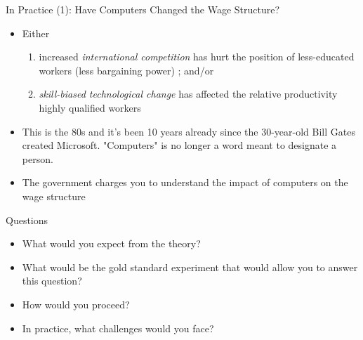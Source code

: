 \documentclass[notes,10pt, aspectratio=169]{beamer}
\begin{document}
\begin{frame}{In Practice (1): Have Computers Changed the Wage Structure?}
\begin{itemize}
    \item Either
    \begin{enumerate}
        \item increased \textit{international competition} has hurt the position of less-educated workers (less bargaining power) ; and/or
        \item \textit{skill-biased technological change} has affected the relative productivity highly qualified workers
    \end{enumerate}
    \item This is the 80s and it's been 10 years already since the 30-year-old Bill Gates created Microsoft. "Computers" is no longer a word meant to designate a person.
    \item The government charges you to understand the impact of computers on the wage structure
\end{itemize}

    \begin{exampleblock}{Questions}
    \begin{itemize}
        \item What would you expect from the theory?
        \item What would be the gold standard experiment that would allow you to answer this question?
        \item How would you proceed?
        \item In practice, what challenges would you face?
    \end{itemize}
    \end{exampleblock}
\end{frame}
\end{document}
